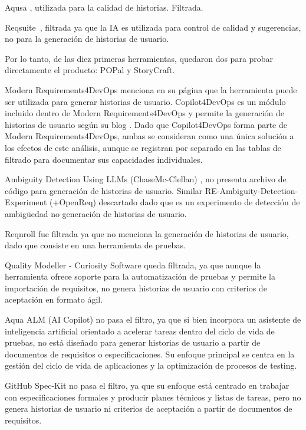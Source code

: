 Aqusa \cite{aqusa}, utilizada para la calidad de historias. Filtrada.

Reqsuite~\cite{reqsuite}, filtrada ya que la IA es utilizada para control de calidad y sugerencias, no para la generación de historias de usuario.

Por lo tanto, de las diez primeras herramientas, quedaron dos para probar directamente el producto: POPal y StoryCraft.

Modern Requirements4DevOps \cite{modernreq1} menciona en su página \cite{modernreq2} que la herramienta puede ser utilizada para generar historias de usuario. Copilot4DevOps \cite{copilotfordevops1} es un módulo incluido dentro de Modern Requirements4DevOps y permite la generación de historias de usuario según su blog \cite{copilotfordevops2}. Dado que Copilot4DevOps forma parte de Modern Requirements4DevOps, ambas se consideran como una única solución a los efectos de este análisis, aunque se registran por separado en las tablas de filtrado para documentar sus capacidades individuales.

Ambiguity Detection Using LLMs (ChaseMc-Clellan) \cite{ambiguitydect}, no presenta archivo de código para generación de historias de usuario. Similar RE-Ambiguity-Detection-Experiment (+OpenReq) \cite{reambiguity} descartado dado que es un experimento de detección de ambigüedad no generación de historias de usuario.

Reqnroll \cite{reqnroll} fue filtrada ya que no menciona la generación de historias de usuario, dado que consiste en una herramienta de pruebas.

Quality Modeller - Curiosity Software \cite{qualitymodeller} queda filtrada, ya que aunque la herramienta ofrece soporte para la automatización de pruebas y permite la importación de requisitos, no genera historias de usuario con criterios de aceptación en formato ágil.

Aqua ALM (AI Copilot) \cite{aquaalm} no pasa el filtro, ya que si bien incorpora un asistente de inteligencia artificial orientado a acelerar tareas dentro del ciclo de vida de pruebas, no está diseñado para generar historias de usuario a partir de documentos de requisitos o especificaciones. Su enfoque principal se centra en la gestión del ciclo de vida de aplicaciones y la optimización de procesos de testing.

GitHub Spec-Kit \cite{spec-kit} no pasa el filtro, ya que su enfoque está centrado en trabajar con especificaciones formales y producir planes técnicos y listas de tareas, pero no genera historias de usuario ni criterios de aceptación a partir de documentos de requisitos.

